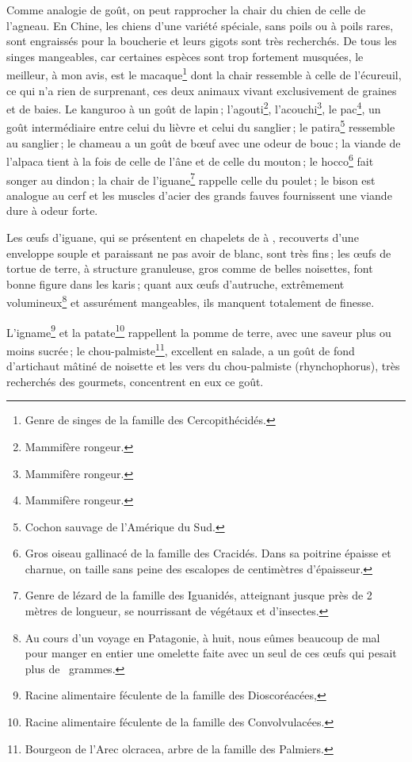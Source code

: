 Comme analogie de goût, on peut rapprocher la chair du chien de celle de
l'agneau. En Chine, les chiens d'une variété spéciale, sans poils ou à poils
rares, sont engraissés pour la boucherie et leurs gigots sont très recherchés.
De tous les singes mangeables, car certaines espèces sont trop fortement
musquées, le meilleur, à mon avis, est le macaque\footnote{Genre de singes de
la famille des Cercopithécidés.} dont la chair ressemble à celle de l'écureuil,
ce qui n'a rien de surprenant, ces deux animaux vivant exclusivement de graines
et de baies. Le kanguroo à un goût de lapin ; l'agouti\footnote{Mammifère
rongeur.}, l'acouchi\footnote{Mammifère rongeur.}, le pac\footnote{Mammifère
rongeur.}, un goût intermédiaire entre celui du lièvre et celui du sanglier ;
le patira\footnote{Cochon sauvage de l'Amérique du Sud.} ressemble au
sanglier ; le chameau a un goût de bœuf avec une odeur de bouc ; la viande de
l'alpaca tient à la fois de celle de l'âne et de celle du mouton ; le
hocco\footnote{Gros oiseau gallinacé de la famille des Cracidés. Dans sa
poitrine épaisse et charnue, on taille sans peine des escalopes de {\mmm}
centimètres d'épaisseur.} fait songer au dindon ; la chair de
l'iguane\footnote{Genre de lézard de la famille des Iguanidés, atteignant
jusque près de 2 mètres de longueur, se nourrissant de végétaux et d'insectes.}
rappelle celle du poulet ; le bison est analogue au cerf et les muscles d'acier
des grands fauves fournissent une viande dure à odeur forte.

Les œufs d'iguane, qui se présentent en chapelets de {\mmm}
à {\mmm}, recouverts d'une enveloppe souple et paraissant ne pas avoir de
blanc, sont très fins ; les œufs de tortue de terre, à structure granuleuse,
gros comme de belles noisettes, font bonne figure dans les karis ; quant aux
œufs d'autruche, extrêmement volumineux\footnote{Au cours d'un voyage en
Patagonie, à huit, nous eûmes beaucoup de mal pour manger en entier une
omelette faite avec un seul de ces œufs qui pesait plus de
{\mmm} {\mmm} grammes.} et assurément mangeables, ils manquent
totalement de finesse.

L'igname\footnote{Racine alimentaire féculente de la famille des
Dioscoréacées,} et la patate\footnote{Racine alimentaire féculente de la
famille des Convolvulacées.} rappellent la pomme de terre, avec une saveur plus
ou moins sucrée ; le chou-palmiste\footnote{Bourgeon de l'Arec olcracea, arbre
de la famille des Palmiers.}, excellent en salade, a un goût de fond
d’artichaut mâtiné de noisette et les vers du chou-palmiste (rhynchophorus),
très recherchés des gourmets, concentrent en eux ce goût.

